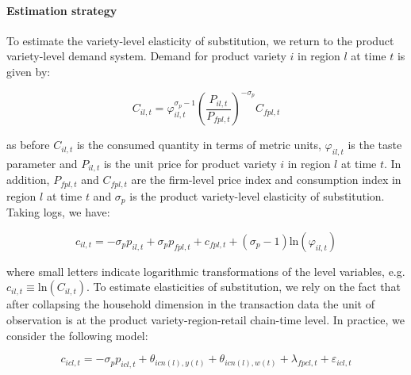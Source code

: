 \paragraph{Estimation strategy}
To estimate the variety-level elasticity of substitution, we return to the product variety-level demand system. Demand for product variety $i$ in region $l$ at time $t$ is given by: 
\begin{linenomath*}
    \begin{equation*}
        C_{il,t} = \varphi_{il,t}^{\sigma_p-1}\left(\frac{P_{il,t}}{P_{fpl,t}}\right)^{-\sigma_p}C_{fpl,t}  
    \end{equation*}
\end{linenomath*}
\noindent as before $C_{il,t}$ is the consumed quantity in terms of metric units, $\varphi_{il,t}$ is the taste parameter and $P_{il,t}$ is the unit price for product variety $i$ in region $l$ at time $t$. In addition, $P_{fpl,t}$ and $C_{fpl,t}$ are the firm-level price index and consumption index in region $l$ at time $t$ and $\sigma_p$ is the product variety-level elasticity of substitution. Taking logs, we have: 
\begin{linenomath*}
    \begin{equation*}
        c_{il,t} = - \sigma_p p_{il,t} + \sigma_p p_{fpl,t} + c_{fpl,t} + (\sigma_p-1)\text{ln}\left(\varphi_{il,t}\right)
    \end{equation*} 
\end{linenomath*}
\noindent where small letters indicate logarithmic transformations of the level variables, e.g. $c_{il,t} \equiv \text{ln}\left(C_{il,t}\right)$. To estimate elasticities of substitution, we rely on the fact that after collapsing the household dimension in the transaction data the unit of observation is at the product variety-region-retail chain-time level. In practice, we consider the following model: 
\begin{linenomath*}
    \begin{equation}\label{eq:struc_est_elas_bar}
        c_{icl,t} = - \sigma_{p} p_{icl,t} + \theta_{icn(l),y(t)} + \theta_{icn(l),w(t)} + \lambda_{fpcl,t} + \varepsilon_{icl,t}
    \end{equation}
\end{linenomath*}
